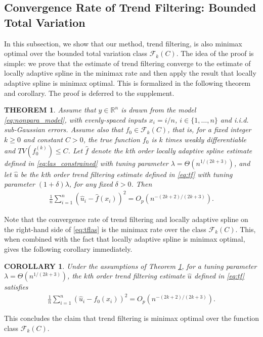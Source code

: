 \documentclass[a4paper]{article}
\newtheorem{theorem}{THEOREM}
\newtheorem{corollary}{COROLLARY}
\newcommand{\RR}{\mathbb{R}}
\renewcommand{\cal}{\mathcal}
\begin{document}
\subsection{Convergence Rate of Trend Filtering: Bounded Total Variation}
In this subsection, we show that our method, trend filtering, is also minimax optimal over the bounded total variation class $\cal{F}_k(C)$. The idea of the proof is simple: we prove that the estimate of trend filtering converge to the estimate of locally adaptive spline in the minimax rate and then apply the result that locally adaptive spline is minimax optimal. This is formalized in the following theorem and corollary. The proof is deferred to the supplement. 
\begin{theorem}
Assume that $y\in\RR^n$ is drawn from the model \eqref{eq:nonpara_model}, with evenly-spaced inputs $x_i = i/n$, $i\in\{1,\ldots, n\}$ and i.i.d. sub-Gaussian errors. Assume also that $f_0\in\cal{F}_k(C)$, that is, for a fixed integer $k\geq 0$ and constant $C > 0$, the true function $f_0$ is $k$ times weakly differentiable and $TV(f_0^{(k)})\leq C$. Let $\hat{f}$ denote the $k$th order locally adaptive spline estimate defined in \eqref{eq:las_constrained} with tuning parameter $\lambda = \Theta(n^{1/(2k+3)})$, and let $\hat{u}$ be the $k$th order trend filtering estimate defined in \eqref{eq:tf} with tuning parameter $(1+\delta)\lambda$, for any fixed $\delta > 0$. Then 
\begin{align}
\frac{1}{n}\sum_{i=1}^n(\hat{u}_i - \hat{f}(x_i))^2 = O_p(n^{-(2k+2)/(2k+3)}).
\label{eq:tflas}
\end{align}
\label{thm:1}
\end{theorem}
Note that the convergence rate of trend filtering and locally adaptive spline on the right-hand side of \eqref{eq:tflas} is the minimax rate over the class $\cal{F}_k(C)$. This, when combined with the fact that locally adaptive spline is minimax optimal, gives the following corollary immediately.

\begin{corollary}
Under the assumptions of Theorem \ref{thm:1}, for a tuning parameter $\lambda = \Theta(n^{1/(2k+3)})$, the $k$th order trend filtering estimate $\hat{u}$ defined in \eqref{eq:tf} satisfies
\begin{align*}
\frac{1}{n}\sum_{i=1}^n (\hat{u}_i - f_0(x_i))^2 = O_p(n^{-(2k+2)/(2k+3)}).
\end{align*}
\end{corollary}
This concludes the claim that trend filtering is minimax optimal over the function class $\cal{F}_k(C)$.
\end{document}
